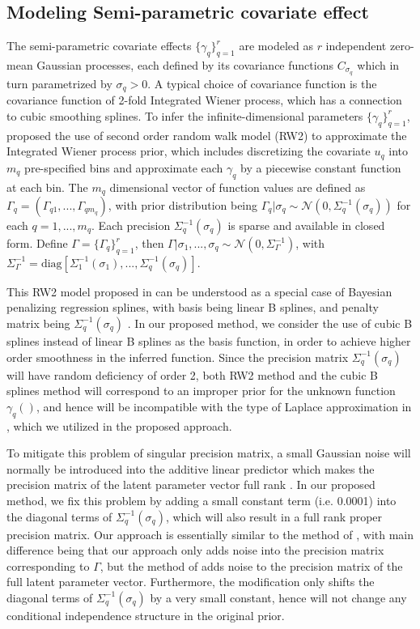 \documentclass[ba]{imsart}
\begin{document}
\subsection{Modeling Semi-parametric covariate effect}\label{subsec:smooth}

The semi-parametric covariate effects $\{\gamma_q\}_{q=1}^{r}$ are modeled as $r$ independent zero-mean Gaussian processes, each defined by its covariance functions $C_{\sigma_{q}}$ which in turn parametrized by $\sigma_q > 0$. A typical choice of covariance function is the covariance function of 2-fold Integrated Wiener process\citep{wiener}, which has a connection to cubic smoothing splines\citep{wahbaprior}.
To infer the infinite-dimensional parameters $\{\gamma_q\}_{q=1}^{r}$, \cite{rw2} proposed the use of second order random walk model (RW2) to approximate the Integrated Wiener process prior, which includes discretizing the covariate $u_q$ into $m_q$ pre-specified bins and approximate each $\gamma_q$ by a piecewise constant function at each bin. The $m_q$ dimensional vector of function values are defined as $\Gamma_q = (\Gamma_{q1}, ..., \Gamma_{qm_q})$, with prior distribution being $\Gamma_q|\sigma_q \sim \mathcal{N}(0,\Sigma_q^{-1}(\sigma_q))$ for each $q = 1,...,m_q$. Each precision $\Sigma_q^{-1}(\sigma_q)$ is sparse and available in closed form. Define $\Gamma = \{\Gamma_q\}_{q=1}^{r}$, then $\Gamma|\sigma_1,...,\sigma_q \sim \mathcal{N}(0,\Sigma_\Gamma^{-1})$, with $\Sigma_\Gamma^{-1} = \text{diag}[\Sigma_1^{-1}(\sigma_1), ..., \Sigma_q^{-1}(\sigma_q)]$.

This RW2 model proposed in \cite{rw2} can be understood as a special case of Bayesian penalizing regression splines, with basis being linear B splines, and penalty matrix being $\Sigma_q^{-1}(\sigma_q)$ \citep{SPDEandPspline}. In our proposed method, we consider the use of cubic B splines instead of linear B splines as the basis function, in order to achieve higher order smoothness in the inferred function. Since the precision matrix $\Sigma_q^{-1}(\sigma_q)$ will have random deficiency of order 2, both RW2 method and the cubic B splines method will correspond to an improper prior for the unknown function $\gamma_q()$, and hence will be incompatible with the type of Laplace approximation in \cite{tierney}, which we utilized in the proposed approach. 

To mitigate this problem of singular precision matrix, a small Gaussian noise will normally be introduced into the additive linear predictor which makes the precision matrix of the latent parameter vector full rank \citep{casecross,inla}. In our proposed method, we fix this problem by adding a small constant term (i.e. 0.0001) into the diagonal terms of $\Sigma_q^{-1}(\sigma_q)$, which will also result in a full rank proper precision matrix. Our approach is essentially similar to the method of \cite{casecross,inla}, with main difference being that our approach only adds noise into the precision matrix corresponding to $\Gamma$, but the method of \cite{casecross,inla} adds noise to the precision matrix of the full latent parameter vector. Furthermore, the modification only shifts the diagonal terms of $\Sigma_q^{-1}(\sigma_q)$ by a very small constant, hence will not change any conditional independence structure in the original prior.
\end{document}
